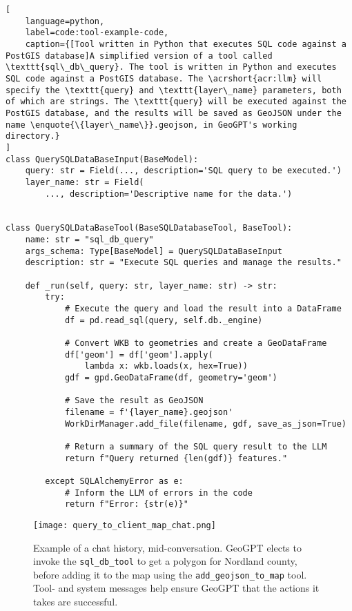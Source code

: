 \begin{lstlisting}[
    language=python,
    label=code:tool-example-code,
    caption={[Tool written in Python that executes SQL code against a PostGIS database]A simplified version of a tool called \texttt{sql\_db\_query}. The tool is written in Python and executes SQL code against a PostGIS database. The \acrshort{acr:llm} will specify the \texttt{query} and \texttt{layer\_name} parameters, both of which are strings. The \texttt{query} will be executed against the PostGIS database, and the results will be saved as GeoJSON under the name \enquote{\{layer\_name\}}.geojson, in GeoGPT's working directory.} 
]
class QuerySQLDataBaseInput(BaseModel):
    query: str = Field(..., description='SQL query to be executed.')
    layer_name: str = Field(
        ..., description='Descriptive name for the data.')


class QuerySQLDataBaseTool(BaseSQLDatabaseTool, BaseTool):
    name: str = "sql_db_query"
    args_schema: Type[BaseModel] = QuerySQLDataBaseInput
    description: str = "Execute SQL queries and manage the results."

    def _run(self, query: str, layer_name: str) -> str:
        try:
            # Execute the query and load the result into a DataFrame
            df = pd.read_sql(query, self.db._engine)

            # Convert WKB to geometries and create a GeoDataFrame
            df['geom'] = df['geom'].apply(
                lambda x: wkb.loads(x, hex=True))
            gdf = gpd.GeoDataFrame(df, geometry='geom')

            # Save the result as GeoJSON
            filename = f'{layer_name}.geojson'
            WorkDirManager.add_file(filename, gdf, save_as_json=True)

            # Return a summary of the SQL query result to the LLM
            return f"Query returned {len(gdf)} features."

        except SQLAlchemyError as e:
            # Inform the LLM of errors in the code
            return f"Error: {str(e)}"
\end{lstlisting}

\begin{figure}
    \centering
    \texttt{[image: query\_to\_client\_map\_chat.png]}
    \caption[Example of a chat history]{Example of a chat history, mid-conversation. GeoGPT elects to invoke the \texttt{sql\_db\_tool} to get a polygon for Nordland county, before adding it to the map using the \texttt{add\_geojson\_to\_map} tool. Tool- and system messages help ensure GeoGPT that the actions it takes are successful.}
    \label{fig:chat-trace-example}
\end{figure}


